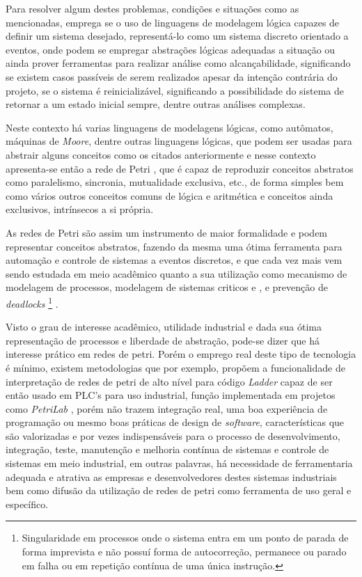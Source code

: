 Para resolver algum destes problemas, condições e situações como as mencionadas, emprega se o uso de linguagens de modelagem lógica capazes de definir um sistema desejado, representá-lo como um sistema discreto orientado a eventos, onde podem se empregar abstrações lógicas adequadas a situação ou ainda prover ferramentas para realizar análise como alcançabilidade, significando se existem casos passíveis de serem realizados apesar da intenção contrária do projeto, se o sistema é reinicializável, significando a possibilidade do sistema de retornar a um estado inicial sempre, dentre outras análises complexas.

Neste contexto há varias linguagens de modelagens lógicas, como autômatos, máquinas de \textit{Moore}, dentre outras linguagens lógicas, que podem ser usadas para abstrair alguns conceitos como os citados anteriormente e nesse contexto apresenta-se então a rede de Petri \cite{scholarpedia2011}, que é capaz de reproduzir conceitos abstratos como paralelismo, sincronia, mutualidade exclusiva, etc., de forma simples bem como vários outros conceitos comuns de lógica e aritmética e conceitos ainda exclusivos, intrínsecos a si própria. 

As redes de Petri são assim um instrumento de maior formalidade e podem representar conceitos abstratos, fazendo da mesma uma ótima ferramenta para automação e controle de sistemas a eventos discretos, e que cada vez mais vem sendo estudada em meio acadêmico quanto a sua utilização como mecanismo de modelagem de processos, modelagem de sistemas criticos \cite{1702225} e \cite{ghezzi1991unified}, e prevenção de \textit{deadlocks} \footnote{Singularidade em processos onde o sistema entra em um ponto de parada de forma imprevista e não possuí forma de autocorreção, permanece ou parado em falha ou em repetição contínua de uma única instrução.} \cite{kaid2015applications}.

Visto o grau de interesse acadêmico, utilidade industrial e dada sua ótima representação de processos e liberdade de abstração, pode-se dizer que há interesse prático em redes de petri. Porém o emprego real deste tipo de tecnologia é mínimo, existem metodologias \cite{6621049} que por exemplo, propõem a funcionalidade de interpretação de redes de petri de alto nível para código \textit{Ladder} capaz de ser então usado em PLC's para uso industrial, função implementada em projetos como \textit{PetriLab} \cite{de2015petrilab}, porém não trazem integração real, uma boa experiência de programação ou mesmo boas práticas de design de \textit{\textit{software}}, características que são valorizadas e por vezes indispensáveis para o processo de desenvolvimento, integração, teste, manutenção e melhoria contínua de sistemas e controle de sistemas em meio industrial, em outras palavras, há necessidade de ferramentaria adequada e atrativa as empresas e desenvolvedores destes sistemas industriais bem como difusão da utilização de redes de petri como ferramenta de uso geral e específico.

